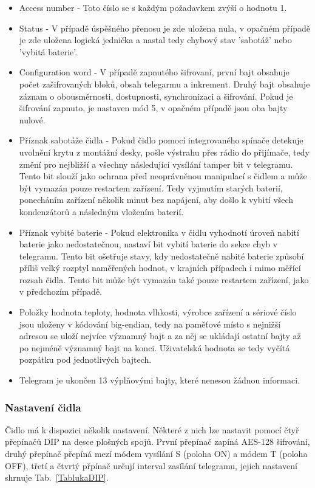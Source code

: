 \begin{itemize}
	\item Access number - Toto číslo se s každým požadavkem zvýší o hodnotu 1.
	\item Status - V případě úspěšného přenosu je zde uložena nula, v opačném případě je zde uložena logická jednička a nastal tedy chybový stav 'sabotáž' nebo 'vybitá baterie'.
	\item Configuration word - V případě zapnutého šifrovaní, první bajt obsahuje počet zašifrovaných bloků, obsah telegarmu a inkrement. Druhý bajt obsahuje záznam o obousměrnosti, dostupnosti, synchronizaci a šifrování. Pokud je šifrování zapnuto, je nastaven mód 5, v opačném případě jsou oba bajty nulové.
	\item Příznak sabotáže čidla - Pokud čidlo pomocí integrovaného spínače detekuje uvolnění krytu z montážní desky, pošle výstrahu přes rádio do přijímače, tedy změní pro nejbližší a všechny následující vysílání tamper bit v telegramu. Tento bit slouží jako ochrana před neoprávněnou manipulací s čidlem a může být vymazán pouze restartem zařízení. Tedy vyjmutím starých baterií, ponecháním zařízení několik minut bez napájení, aby došlo k vybití všech kondenzátorů a následným vložením baterií.
\item Příznak vybité baterie - Pokud elektronika v čidlu vyhodnotí úroveň nabití baterie jako nedostatečnou, nastaví bit vybití baterie do sekce chyb v telegramu. Tento bit ošetřuje stavy, kdy nedostatečně nabité baterie způsobí příliš velký rozptyl naměřených hodnot, v krajních případech i mimo měřící rozsah čidla. Tento bit může být vymazán také pouze restartem zařízení, jako v předchozím případě.
\item Položky hodnota teploty, hodnota vlhkosti, výrobce zařízení a sériové číslo jsou uloženy v kódování big-endian, tedy na paměťové místo s nejnižší adresou se uloží nejvíce významný bajt a za něj se ukládají ostatní bajty až po nejméně významný bajt na konci. Uživatelská hodnota se tedy vyčítá pozpátku pod jednotlivých bajtech.
\item Telegram je ukončen 13 výplňovými bajty, které nenesou žádnou informaci.
\end{itemize}


\subsubsection{Nastavení čidla}
Čidlo má k dispozici několik nastavení. Některé z nich lze nastavit pomocí čtyř přepínačů DIP na desce plošných spojů.
První přepínač zapíná AES-128 šifrování, druhý přepínač přepíná mezí módem vysílání S (poloha ON) a módem T (poloha OFF), třetí a čtvrtý přpínač určují interval zasílání telegramu, jejich nastavení shrnuje Tab.~\ref{TablukaDIP}.

